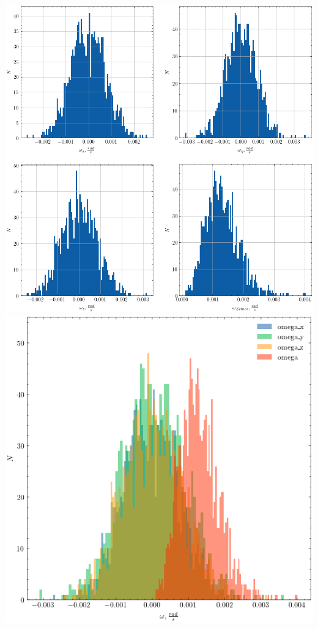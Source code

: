 \documentclass[12pt]{article}
\begin{document}
\begin{center}
    \includegraphics[width=1\textwidth]{Zemes rotācijas leņķiskā ātruma noteikšana2.png}
    \includegraphics[width=1\textwidth]{Zemes rotācijas leņķiskā ātruma noteikšana3.png}
\end{center}
\end{document}
